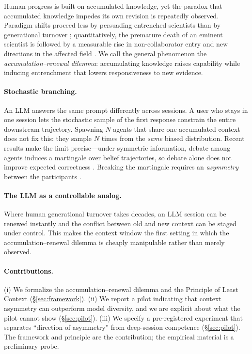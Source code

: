 \documentclass[12pt]{article}
\begin{document}
Human progress is built on accumulated knowledge, yet the paradox that
accumulated knowledge impedes its own revision is repeatedly observed. Paradigm
shifts proceed less by persuading entrenched scientists than by generational
turnover \citep{kuhn1962structure}; quantitatively, the premature death of an
eminent scientist is followed by a measurable rise in non-collaborator entry and
new directions in the affected field \citep{azoulay2019}. We call the general
phenomenon the \emph{accumulation--renewal dilemma}: accumulating knowledge
raises capability while inducing entrenchment that lowers responsiveness to new
evidence.

\paragraph{Stochastic branching.} An LLM answers the same prompt differently
across sessions. A user who stays in one session lets the stochastic sample of
the first response constrain the entire downstream trajectory. Spawning $N$
agents that share one accumulated context does not fix this: they sample $N$
times from the \emph{same} biased distribution. Recent results make the limit
precise---under symmetric information, debate among agents induces a martingale
over belief trajectories, so debate alone does not improve expected correctness
\citep{choi2025debate}. Breaking the martingale requires an \emph{asymmetry}
between the participants \citep{liu2026acemad,young2026divergence}.

\paragraph{The LLM as a controllable analog.} Where human generational turnover
takes decades, an LLM session can be renewed instantly and the conflict between
old and new context can be staged under control. This makes the context window
the first setting in which the accumulation--renewal dilemma is cheaply
manipulable rather than merely observed.

\paragraph{Contributions.}
(i) We formalize the accumulation--renewal dilemma and the Principle of Least
Context (\S\ref{sec:framework}).
(ii) We report a pilot indicating that context asymmetry can outperform model
diversity, and we are explicit about what the pilot cannot show
(\S\ref{sec:pilot}).
(iii) We specify a pre-registered experiment that separates ``direction of
asymmetry'' from deep-session competence (\S\ref{sec:pilot}).
The framework and principle are the contribution; the empirical material is a
preliminary probe.
\end{document}
